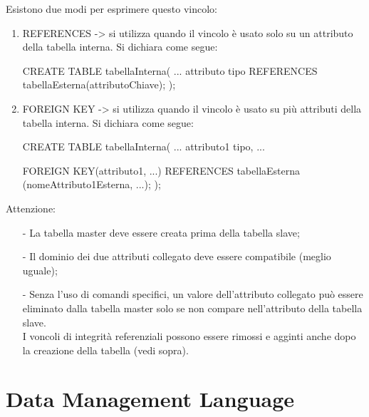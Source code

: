 \documentclass[a4paper, 10pt]{report}
\begin{document}
\noindent Esistono due modi per esprimere questo vincolo:
\begin{enumerate}
\item REFERENCES -> si utilizza quando il vincolo è usato solo su un attributo della tabella interna. Si dichiara come segue:
\begin{code}
	CREATE TABLE tabellaInterna(
		...
		attributo tipo REFERENCES
			tabellaEsterna(attributoChiave);
	);
\end{code}
\item FOREIGN KEY -> si utilizza  quando il vincolo è usato su più attributi della tabella interna. Si dichiara come segue:
\begin{code}
	CREATE TABLE tabellaInterna(
		...
		attributo1 tipo,
		...
		
		FOREIGN KEY(attributo1, ...) REFERENCES tabellaEsterna (nomeAttributo1Esterna, ...);
	);
\end{code}
\end{enumerate}
					\newpage
\noindent Attenzione: 
\begin{itemize}
\item[-] La tabella master deve essere creata prima della tabella slave;
\item[-] Il dominio dei due attributi collegato deve essere compatibile (meglio uguale);
\item[-] Senza l'uso di comandi specifici, un valore dell'attributo collegato può essere eliminato dalla tabella master solo se non compare nell'attributo della tabella slave.
\\

\noindent I voncoli di integrità referenziali possono essere rimossi e agginti anche dopo la creazione della tabella (vedi sopra).
\end{itemize}

\section{Data Management Language}
\end{document}
